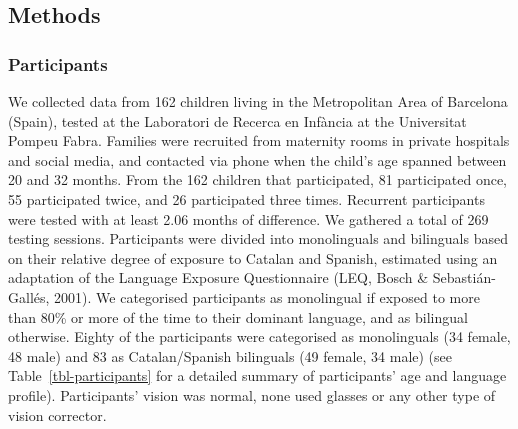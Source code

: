 \documentclass[
  12pt,
  b5paperpaper,
  twoside]{scrreprt}
\begin{document}
\hypertarget{methods-1}{%
\subsection{Methods}\label{methods-1}}

\hypertarget{participants-1}{%
\subsubsection{Participants}\label{participants-1}}

We collected data from 162 children living in the Metropolitan Area of
Barcelona (Spain), tested at the Laboratori de Recerca en Infància at
the Universitat Pompeu Fabra. Families were recruited from maternity
rooms in private hospitals and social media, and contacted via phone
when the child's age spanned between 20 and 32 months. From the 162
children that participated, 81 participated once, 55 participated twice,
and 26 participated three times. Recurrent participants were tested with
at least 2.06 months of difference. We gathered a total of 269 testing
sessions. Participants were divided into monolinguals and bilinguals
based on their relative degree of exposure to Catalan and Spanish,
estimated using an adaptation of the Language Exposure Questionnaire
(LEQ, Bosch \& Sebastián-Gallés, 2001). We categorised participants as
monolingual if exposed to more than 80\% or more of the time to their
dominant language, and as bilingual otherwise. Eighty of the
participants were categorised as monolinguals (34 female, 48 male) and
83 as Catalan/Spanish bilinguals (49 female, 34 male) (see
Table~\ref{tbl-participants} for a detailed summary of participants' age
and language profile). Participants' vision was normal, none used
glasses or any other type of vision corrector.
\end{document}
